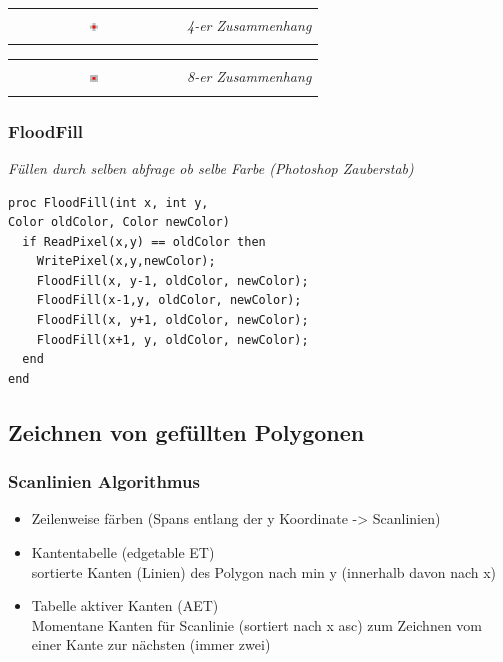 \begin{tabular}{cl}
    \multirow{3}{*}{
        \includegraphics[width=0.05\textwidth]{assets/region-filling-4.png}
    } & \\
    & \textit{4-er Zusammenhang} \\
    & \\
\end{tabular}
\begin{tabular}{cl}
    \multirow{3}{*}{
        \includegraphics[width=0.05\textwidth]{assets/region-filling-8.png}
    } & \\
    & \textit{8-er Zusammenhang} \\
    & \\
\end{tabular}

\subsubsection{FloodFill}

\textit{Füllen durch selben abfrage ob selbe Farbe (Photoshop Zauberstab)}
\begin{lstlisting}
proc FloodFill(int x, int y, 
Color oldColor, Color newColor)
  if ReadPixel(x,y) == oldColor then 
    WritePixel(x,y,newColor);
    FloodFill(x, y-1, oldColor, newColor); 
    FloodFill(x-1,y, oldColor, newColor); 
    FloodFill(x, y+1, oldColor, newColor); 
    FloodFill(x+1, y, oldColor, newColor);
  end
end
\end{lstlisting}

\subsection{Zeichnen von gefüllten Polygonen}

\subsubsection{Scanlinien Algorithmus}

\begin{itemize}
	\item Zeilenweise färben (Spans entlang der y Koordinate -> Scanlinien)
	\item Kantentabelle (edgetable ET)\\
		sortierte Kanten (Linien) des Polygon nach min y (innerhalb davon nach x)
	\item Tabelle aktiver Kanten (AET)\\
		Momentane Kanten für Scanlinie (sortiert nach x asc) zum Zeichnen vom einer Kante zur nächsten (immer zwei)
\end{itemize}

